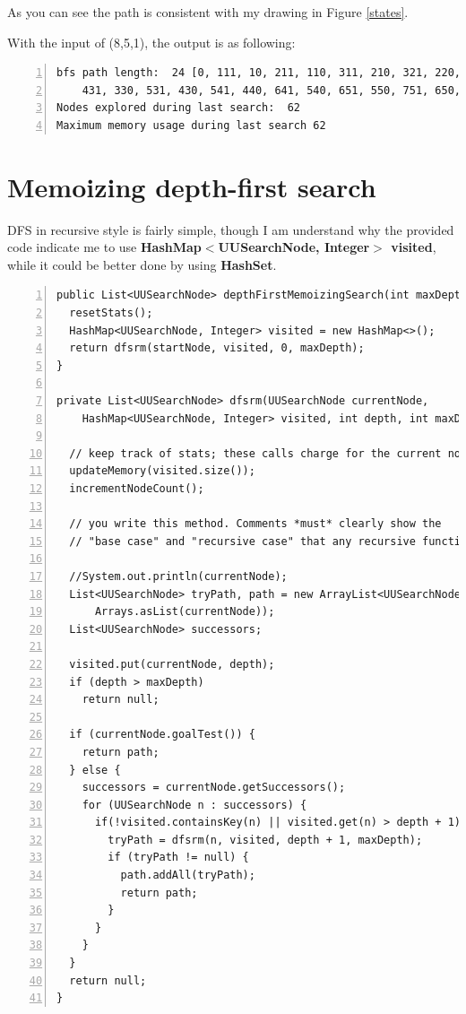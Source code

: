 \documentclass{article}
\begin{document}
As you can see the path is consistent with my drawing in Figure \ref{states}.

With the input of (8,5,1), the output is as following:

\begin{lstlisting}[numbers=left]
bfs path length:  24 [0, 111, 10, 211, 110, 311, 210, 321, 220, 421, 320,
	431, 330, 531, 430, 541, 440, 641, 540, 651, 550, 751, 650, 851]
Nodes explored during last search:  62
Maximum memory usage during last search 62
\end{lstlisting}













\section{Memoizing depth-first search}

DFS in recursive style is fairly simple, though I am understand why the provided code indicate me to use \textbf{HashMap$<$UUSearchNode, Integer$>$ visited}, while it could be better done by using \textbf{HashSet}. 

\begin{lstlisting}[numbers=left]
public List<UUSearchNode> depthFirstMemoizingSearch(int maxDepth) {
  resetStats();
  HashMap<UUSearchNode, Integer> visited = new HashMap<>();
  return dfsrm(startNode, visited, 0, maxDepth);
}

private List<UUSearchNode> dfsrm(UUSearchNode currentNode,
    HashMap<UUSearchNode, Integer> visited, int depth, int maxDepth) {

  // keep track of stats; these calls charge for the current node
  updateMemory(visited.size());
  incrementNodeCount();

  // you write this method. Comments *must* clearly show the
  // "base case" and "recursive case" that any recursive function has.

  //System.out.println(currentNode);
  List<UUSearchNode> tryPath, path = new ArrayList<UUSearchNode>(
      Arrays.asList(currentNode));
  List<UUSearchNode> successors;

  visited.put(currentNode, depth);
  if (depth > maxDepth)
    return null;      
  
  if (currentNode.goalTest()) {
    return path;
  } else {
    successors = currentNode.getSuccessors();
    for (UUSearchNode n : successors) {
      if(!visited.containsKey(n) || visited.get(n) > depth + 1) {
        tryPath = dfsrm(n, visited, depth + 1, maxDepth);
        if (tryPath != null) {
          path.addAll(tryPath);
          return path;
        }
      }
    }
  }
  return null;
}
\end{lstlisting}
\end{document}
